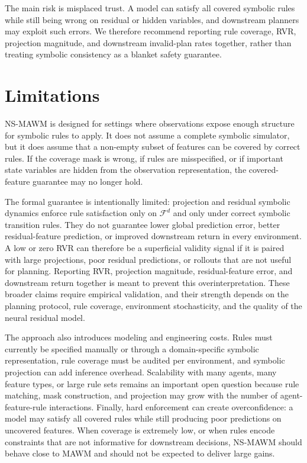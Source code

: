 \documentclass{article}
\theoremstyle{plain}
\theoremstyle{definition}
\theoremstyle{remark}
\begin{document}
The main risk is misplaced trust. A model can satisfy all covered symbolic rules while still being wrong on residual or hidden variables, and downstream planners may exploit such errors. We therefore recommend reporting rule coverage, RVR, projection magnitude, and downstream invalid-plan rates together, rather than treating symbolic consistency as a blanket safety guarantee.

\section{Limitations}
\label{sec:limitations}

NS-MAWM is designed for settings where observations expose enough structure for symbolic rules to apply. It does not assume a complete symbolic simulator, but it does assume that a non-empty subset of features can be covered by correct rules. If the coverage mask is wrong, if rules are misspecified, or if important state variables are hidden from the observation representation, the covered-feature guarantee may no longer hold.

The formal guarantee is intentionally limited: projection and residual symbolic dynamics enforce rule satisfaction only on $\mathcal{F}^d$ and only under correct symbolic transition rules. They do not guarantee lower global prediction error, better residual-feature prediction, or improved downstream return in every environment. A low or zero RVR can therefore be a superficial validity signal if it is paired with large projections, poor residual predictions, or rollouts that are not useful for planning. Reporting RVR, projection magnitude, residual-feature error, and downstream return together is meant to prevent this overinterpretation. These broader claims require empirical validation, and their strength depends on the planning protocol, rule coverage, environment stochasticity, and the quality of the neural residual model.

The approach also introduces modeling and engineering costs. Rules must currently be specified manually or through a domain-specific symbolic representation, rule coverage must be audited per environment, and symbolic projection can add inference overhead. Scalability with many agents, many feature types, or large rule sets remains an important open question because rule matching, mask construction, and projection may grow with the number of agent-feature-rule interactions. Finally, hard enforcement can create overconfidence: a model may satisfy all covered rules while still producing poor predictions on uncovered features. When coverage is extremely low, or when rules encode constraints that are not informative for downstream decisions, NS-MAWM should behave close to MAWM and should not be expected to deliver large gains.
\end{document}
